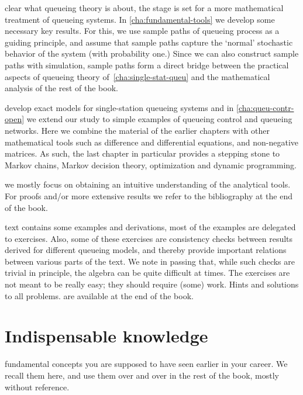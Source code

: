 \documentclass[queueing-book]{subfiles}
\begin{document}
 clear what queueing theory is about, the stage is set for a more mathematical treatment of queueing systems.
In \cref{cha:fundamental-tools} we develop some necessary key results.
For this, we use sample paths of queueing process as a guiding principle, and assume that sample paths capture the `normal' stochastic behavior of the system (with probability one.)
Since we can also construct sample paths with simulation, sample paths form a direct bridge between the practical aspects of queueing theory of~\cref{cha:single-stat-queu} and the mathematical analysis of the rest of the book.


 develop exact models for single-station queueing systems and in \cref{cha:queu-contr-open} we extend our study to simple examples of queueing control and queueing networks.
Here we combine the material of the earlier chapters with other mathematical tools such as difference and differential equations, and non-negative matrices.
As such, the last chapter in particular provides a stepping stone to Markov chains, Markov decision theory, optimization and dynamic programming.

 we mostly focus on obtaining an intuitive understanding of the analytical tools.
For proofs and/or more extensive results we refer to the bibliography at the end of the book.


 text contains some examples and derivations,  most of the examples are delegated to exercises.
Also, some of these exercises are consistency checks between results derived for different queueing models, and thereby provide important relations between various parts of the text.
We note in passing that, while such checks are trivial in principle, the algebra can be quite difficult at times.
The exercises are not meant to be really easy; they should require (some) work.
Hints and solutions to all problems.
are available at the end of the book.


\section{Indispensable knowledge}
\label{sec:indep-knowl}




 fundamental concepts you are supposed to have seen earlier in your career.
We recall them here, and use them over and over in the rest of the book, mostly without reference.
\end{document}
